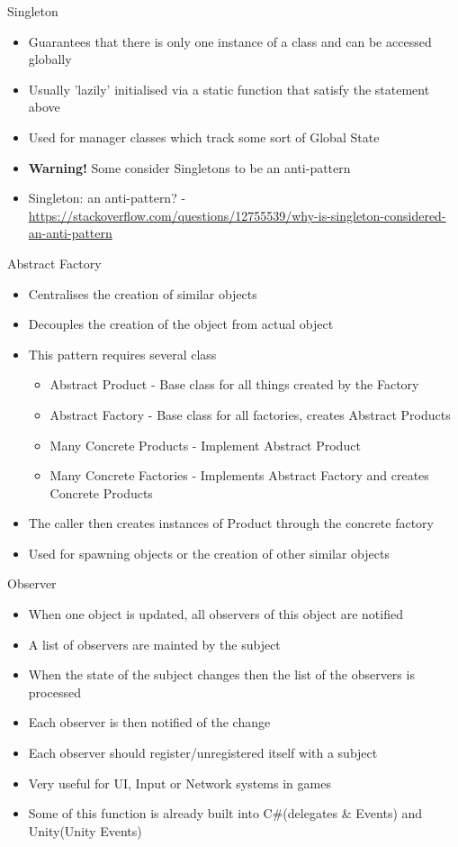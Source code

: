 \begin{frame}{Singleton}
	\begin{itemize}
		\item Guarantees that there is only one instance of a class and can be accessed globally
		\item Usually 'lazily' initialised via a static function that satisfy the statement above
		\item Used for manager classes which track some sort of Global State
		\item \textbf{Warning!} Some consider Singletons to be an anti-pattern
		\item Singleton: an anti-pattern? - \url{https://stackoverflow.com/questions/12755539/why-is-singleton-considered-an-anti-pattern}
	\end{itemize}
\end{frame}


\begin{frame}{Abstract Factory}
	\begin{itemize}
		\item Centralises the creation of similar objects
		\item Decouples the creation of the object from actual object
		\item This pattern requires several class
		\begin{itemize}
			\item Abstract Product - Base class for all things created by the Factory
			\item Abstract Factory - Base class for all factories, creates Abstract Products
			\item Many Concrete Products - Implement Abstract Product
			\item Many Concrete Factories - Implements Abstract Factory and creates Concrete Products 
		\end{itemize}
		\item The caller then creates instances of Product through the concrete factory
		\item Used for spawning objects or the creation of other similar objects
	\end{itemize}
\end{frame}

\begin{frame}{Observer}
	\begin{itemize}
		\item When one object is updated, all observers of this object are notified
		\item A list of observers are mainted by the subject
		\item When the state of the subject changes then the list of the observers is processed
		\item Each observer is then notified of the change
		\item Each observer should register/unregistered itself with a subject 
		\item Very useful for UI, Input or Network systems in games
		\item Some of this function is already built into C\#(delegates \& Events) and Unity(Unity Events)
	\end{itemize}
\end{frame}

